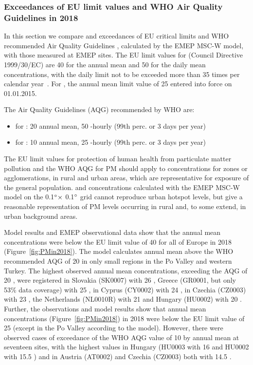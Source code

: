 \subsubsection[PM exceedances]{Exceedances of EU limit values and WHO Air Quality Guidelines in 2018}
\label{subsec:PMexc}

In this section we compare \PM[10] and \PM[2.5] exceedances
of EU critical limits and WHO recommended Air Quality
Guidelines \citep{WHO:AQG}, calculated by the EMEP MSC-W model, with
those measured at EMEP sites. The EU limit values for \PM[10] (Council
Directive 1999/30/EC) are 40 \ug for the annual mean and 50 \ug for
the daily mean concentrations, with the daily limit not to be exceeded
more than 35 times per calendar year~\citep{EU2008}. For \PM[2.5], the
annual mean limit value of 25 \ug entered into force on 01.01.2015.

The Air Quality Guidelines (AQG) recommended by WHO \citep{WHO:AQG}
are:
\begin{itemize}
\item for \PM[10]: 20 \ug annual mean, 50 -hourly (99th perc. or 3 days per year)
\item for \PM[2.5]: 10 \ug annual mean, 25 -hourly (99th perc. or 3 days per year)
\end{itemize}


The EU limit values for protection of human health from particulate
matter pollution and the WHO AQG for PM should apply to concentrations
for zones or agglomerations, in rural and urban areas,
which are representative for exposure of the general
population. \PM[10] and \PM[2.5] concentrations calculated with the
EMEP MSC-W model on the 0.1$^\circ \times$ 0.1$^\circ$ grid cannot
reproduce urban hotspot levels, but give a reasonable representation
of PM levels occurring in rural and, to some extend, in urban background
areas.


Model results and EMEP observational data show that the annual mean \PM[10] concentrations were below the EU limit value of 40 \ug for all of Europe in 2018 (Figure~\ref{fig:PMin2018}). The model calculates annual mean \PM[10] above the WHO recommended AQG of 20 \ug
in only small regions in the Po Valley and western Turkey. The highest
observed annual mean \PM[10] concentrations, exceeding the AQG of 20 \ug, were registered in Slovakia (SK0007) with 26 \ug, Greece (GR0001, but only 53\% data coverage) with 25 \ug, in Cyprus (CY0002) with 24 \ug, in Czechia (CZ0003) with 23 \ug, the Netherlands (NL0010R) with 21 \ug and Hungary (HU0002) with 20 \ug. Further, the observations and model results show that annual mean \PM[2.5] concentrations (Figure~\ref{fig:PMin2018}) in 2018 were below the EU limit value of 25 \ug (except in the Po Valley according to the model). However, there were observed cases of exceedance of the WHO AQG value of 10 \ug by annual mean \PM[2.5] at seventeen sites, with the highest values in Hungary (HU0003 with 16 \ug and HU0002 with
15.5 \ug) and in Austria (AT0002) and Czechia (CZ0003) both with 14.5 \ug.


